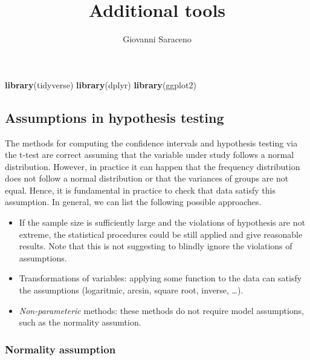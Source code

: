 \documentclass[
]{article}
\title{Additional tools}
\author{Giovanni Saraceno}
\date{}
\newenvironment{Shaded}{\begin{snugshade}}{\end{snugshade}}
\newcommand{\FunctionTok}[1]{\textcolor[rgb]{0.13,0.29,0.53}{\textbf{#1}}}
\newcommand{\NormalTok}[1]{#1}
\providecommand{\tightlist}{%
  \setlength{\itemsep}{0pt}\setlength{\parskip}{0pt}}
\begin{document}
\maketitle

{
\setcounter{tocdepth}{2}
\tableofcontents
}
\begin{Shaded}
\begin{Highlighting}[]
\FunctionTok{library}\NormalTok{(tidyverse)}
\FunctionTok{library}\NormalTok{(dplyr)}
\FunctionTok{library}\NormalTok{(ggplot2)}
\end{Highlighting}
\end{Shaded}

\hypertarget{assumptions-in-hypothesis-testing}{%
\subsection{Assumptions in hypothesis
testing}\label{assumptions-in-hypothesis-testing}}

The methods for computing the confidence intervals and hypothesis
testing via the t-test are correct assuming that the variable under
study follows a normal distribution. However, in practice it can happen
that the frequency distribution does not follow a normal distribution or
that the variances of groups are not equal. Hence, it is fundamental in
practice to check that data satisfy this assumption. In general, we can
list the following possible approaches.

\begin{itemize}
\tightlist
\item
  If the sample size is sufficiently large and the violations of
  hypothesis are not extreme, the statistical procedures could be still
  applied and give reasonable results. Note that this is not suggesting
  to blindly ignore the violations of assumptions.
\item
  Transformations of variables: applying some function to the data can
  satisfy the assumptions (logaritmic, arcsin, square root, inverse,
  \ldots).
\item
  \emph{Non-parameteric} methods: these methods do not require model
  assumptions, such as the normality assumtion.
\end{itemize}

\hypertarget{normality-assumption}{%
\subsubsection{Normality assumption}\label{normality-assumption}}
\end{document}
